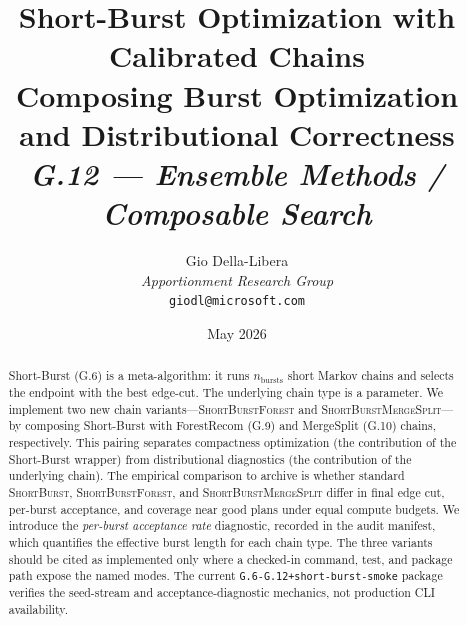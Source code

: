 \documentclass[12pt]{article}
\title{%
  \textbf{Short-Burst Optimization with Calibrated Chains}\\
  \textbf{Composing Burst Optimization and Distributional Correctness}\\[0.8em]
  \normalsize\textit{G.12 --- Ensemble Methods / Composable Search}%
}
\author{%
  Gio Della-Libera\\
  \textit{Apportionment Research Group}\\
  \small\texttt{giodl@microsoft.com}
}
\date{May 2026}
\newcommand{\sbf}{\textsc{ShortBurstForest}}
\newcommand{\sbms}{\textsc{ShortBurstMergeSplit}}
\newcommand{\sburst}{\textsc{ShortBurst}}
\begin{document}
\maketitle

\begin{abstract}
\noindent
Short-Burst (G.6) is a meta-algorithm: it runs \(n_{\mathrm{bursts}}\) short
Markov chains and selects the endpoint with the best edge-cut.
The underlying chain type is a parameter.
We implement two new chain variants---\sbf{} and \sbms{}---by composing
Short-Burst with ForestRecom (G.9) and MergeSplit (G.10) chains,
respectively.
This pairing separates compactness optimization (the contribution of the
Short-Burst wrapper) from distributional diagnostics (the contribution of the
underlying chain).  The empirical comparison to archive is whether standard
\sburst{}, \sbf{}, and \sbms{} differ in final edge cut, per-burst acceptance,
and coverage near good plans under equal compute budgets.
We introduce the \emph{per-burst acceptance rate} diagnostic, recorded in
the audit manifest, which quantifies the effective burst length for each
chain type.
The three variants should be cited as implemented only where a checked-in
command, test, and package path expose the named modes.
The current \texttt{G.6-G.12+short-burst-smoke} package verifies the seed-stream
and acceptance-diagnostic mechanics, not production CLI availability.
\end{abstract}

\tableofcontents
\newpage











\end{document}
